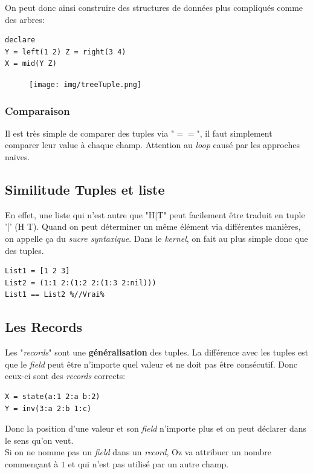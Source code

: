 \documentclass{report}
\begin{document}
On peut donc ainsi construire des structures de données plus compliqués comme des arbres:
\begin{lstlisting}
declare
Y = left(1 2) Z = right(3 4)
X = mid(Y Z)
\end{lstlisting}

\begin{figure}[H]
\centering
\texttt{[image: img/treeTuple.png]}
\end{figure}
\subsubsection{Comparaison}
Il est très simple de comparer des tuples via "$==$", il faut simplement comparer leur value à chaque champ. Attention au \textit{loop} causé par les approches naïves.\\

\subsection{Similitude Tuples et liste}
En effet, une liste qui n'est autre que "H|T" peut facilement être traduit en tuple '|' (H T). Quand on peut déterminer un même élément via différentes manières, on appelle ça du \textit{sucre syntaxique}. Dans le \textit{kernel}, on fait au plus simple donc que des tuples.
\begin{lstlisting}[escapechar=\%]
List1 = [1 2 3]
List2 = (1:1 2:(1:2 2:(1:3 2:nil)))
List1 == List2 %//Vrai%
\end{lstlisting}

\subsection{Les Records} \label{record}
Les "\textit{records}" sont une \textbf{généralisation} des tuples. La différence avec les tuples est que le \textit{field} peut être n'importe quel valeur et ne doit pas être consécutif. Donc ceux-ci sont des \textit{records} corrects:
\begin{lstlisting}
X = state(a:1 2:a b:2)
Y = inv(3:a 2:b 1:c)
\end{lstlisting}
Donc la position d'une valeur et son \textit{field} n'importe plus et on peut déclarer dans le sens qu'on veut.\\
Si on ne nomme pas un \textit{field} dans un \textit{record}, Oz va attribuer un nombre commençant à $1$ et qui n'est pas utilisé par un autre champ.\\
\end{document}
